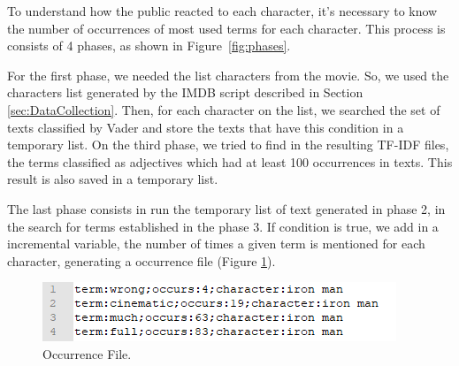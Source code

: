 To understand how the public reacted to each character, it's necessary to know the number of occurrences of most used terms for each character. This process is consists of 4 phases, as shown in Figure~\ref{fig:phases}. 

For the first phase, we needed the list characters from the movie. So, we used the characters list generated by the IMDB script described in Section \ref{sec:DataCollection}. Then, for each character on
the list, we searched the set of texts classified by Vader %
and store the texts that have this condition in a temporary list. On the third phase, we tried to find in the resulting TF-IDF files, the terms classified as adjectives which had at least 100 occurrences in texts. This result is also saved in a temporary list.  

The last phase consists in %
run the temporary list of text generated in phase 2, in the search for terms established in the phase 3. If condition is true, we add in a incremental variable, the number of times a given term is mentioned for each character, generating a occurrence file (Figure \ref{fig:occurs}). 


\begin{figure}[h]
    \begin{center}
        \includegraphics[width=0.8\linewidth]{img/occurs.png}
    \end{center}
       \caption{Occurrence File.} 
    \label{fig:occurs}
\end{figure}

